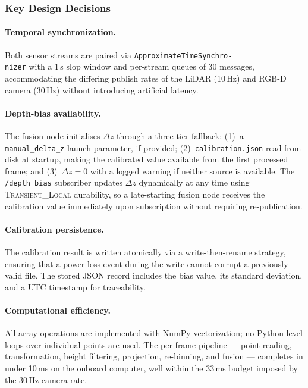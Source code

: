 \subsubsection{Key Design Decisions}

\paragraph{Temporal synchronization.}
Both sensor streams are paired via \texttt{ApproximateTimeSynchro-\\nizer}
with a 1\,s slop window and per-stream queues of 30 messages,
accommodating the differing publish rates of the LiDAR (10\,Hz) and
RGB-D camera (30\,Hz) without introducing artificial latency.

\paragraph{Depth-bias availability.}
The fusion node initialises $\Delta z$ through a three-tier fallback:
(1)~a \texttt{manual\_delta\_z} launch parameter, if provided;
(2)~\texttt{calibration.json} read from disk at startup, making the
calibrated value available from the first processed frame; and
(3)~$\Delta z = 0$ with a logged warning if neither source is
available. The \texttt{/depth\_bias} subscriber updates $\Delta z$
dynamically at any time using \textsc{Transient\_Local} durability,
so a late-starting fusion node receives the calibration value
immediately upon subscription without requiring re-publication.

\paragraph{Calibration persistence.}
The calibration result is written atomically via a write-then-rename
strategy, ensuring that a power-loss event during the write cannot
corrupt a previously valid file. The stored JSON record includes the
bias value, its standard deviation, and a UTC timestamp for
traceability.

\paragraph{Computational efficiency.}
All array operations are implemented with NumPy vectorization; no
Python-level loops over individual points are used. The per-frame
pipeline — point reading, transformation, height filtering,
projection, re-binning, and fusion — completes in under 10\,ms on
the onboard computer, well within the 33\,ms budget imposed by the
30\,Hz camera rate.

